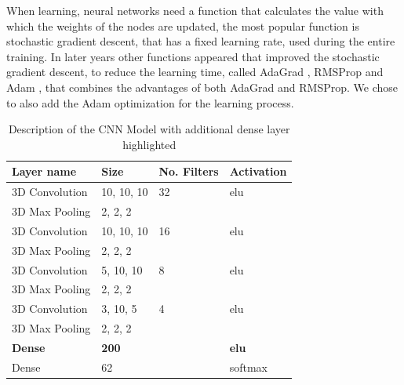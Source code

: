 \documentclass[12pt]{article}
\theoremstyle{definition}
\begin{document}
	When learning, neural networks need a function that calculates the value with which the weights of the nodes are updated, the most popular function is stochastic gradient descent, that has a fixed learning rate, used during the entire training. In later years other functions appeared that improved the stochastic gradient descent, to reduce the learning time, called AdaGrad \cite{adagrad-optimizer}, RMSProp \cite{rmsprop-optimizer} and Adam \cite{adam-optimizer}, that combines the advantages of both AdaGrad and RMSProp.
	We chose to also add the Adam optimization for the learning process.

	\begin{table}[h]
		\centering
		\renewcommand{\arraystretch}{1.5}

		\caption{Description of the CNN Model with additional dense layer highlighted}
		\label{table:dense-CNN}

		\begin{tabularx}{\textwidth}{XXXX}
			\textbf{Layer name} & \textbf{Size} & \textbf{No. Filters} & \textbf{Activation} \\ \hline
			3D Convolution    & 10, 10, 10   & 32                   & elu                  \\ \hline
			3D Max Pooling    & 2, 2, 2      & \textbf{\textendash} & \textbf{\textendash} \\ \hline
			3D Convolution    & 10, 10, 10   & 16                   & elu                  \\ \hline
			3D Max Pooling    & 2, 2, 2      & \textbf{\textendash} & \textbf{\textendash} \\ \hline
			3D Convolution    & 5, 10, 10    & 8                    & elu                  \\ \hline
			3D Max Pooling    & 2, 2, 2      & \textbf{\textendash} & \textbf{\textendash} \\ \hline
			3D Convolution    & 3, 10, 5     & 4                    & elu                  \\ \hline
			3D Max Pooling    & 2, 2, 2      & \textbf{\textendash} & \textbf{\textendash} \\ \hline
			\rowcolor{Gray}
			\textbf{Dense} & \textbf{200} & \textbf{\textendash} & \textbf{elu}         \\ \hline
			Dense          & 62           & \textbf{\textendash} & softmax              \\
		\end{tabularx}
	\end{table}
\end{document}
